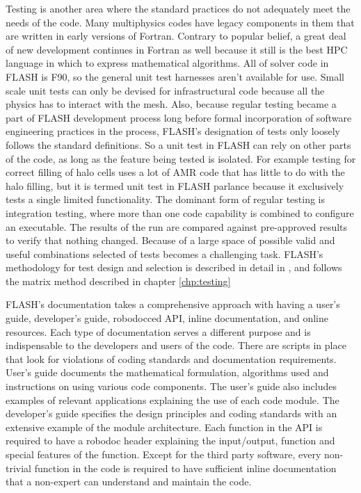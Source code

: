 Testing is another area where the standard practices do not adequately
meet the needs of the code. Many multiphysics codes have legacy
components in them that are written in early versions of
Fortran. Contrary to popular belief, a great deal of new development
continues in Fortran as well because it still is the best HPC language
in which to express mathematical algorithms. All of solver code in
FLASH is F90, so the general unit test harnesses aren't available for
use. Small scale unit tests can only be devised for infrastructural
code because all the physics has to interact with the mesh. Also,
because regular testing became a part of FLASH development process
long before formal incorporation of software engineering practices in
the process, FLASH's designation of tests only loosely follows the
standard definitions. So a unit test in FLASH can rely on other parts
of the code, as long as the feature being tested is isolated. For
example testing for correct filling of halo cells uses a lot of AMR
code that has little to do with the halo filling, but it is termed
unit test in FLASH parlance because it exclusively tests a single
limited functionality. The dominant form of regular testing is
integration testing, where more than one code  capability is combined to
configure an executable. The results of the run are compared against
pre-approved results to verify that nothing changed. Because of a
large space of possible valid and useful combinations selected of tests
becomes a challenging task. FLASH's methodology for test design and
selection is described in detail in \cite{Dubey2015}, and follows the
matrix method described in chapter \ref{chp:testing}

FLASH's documentation takes a comprehensive approach with having a
user's guide, developer's guide, robodocced API, inline documentation,
and online resources. Each type of documentation serves a different
purpose and is indispensable to the developers and users of the code.  
There are scripts in place that look for violations of coding
standards and documentation requirements. User's guide documents the
mathematical formulation, algorithms used and instructions on using
various code components. The user's guide also includes examples of
relevant applications explaining the use of each code module. The
developer's guide specifies the design principles and coding standards
with an extensive example of the module architecture. Each function in
the API is required to have a robodoc header explaining the
input/output, function and special features of the function. Except
for the third party software, every non-trivial function in the code
is required to have sufficient inline documentation that a non-expert
can understand and maintain the code.


